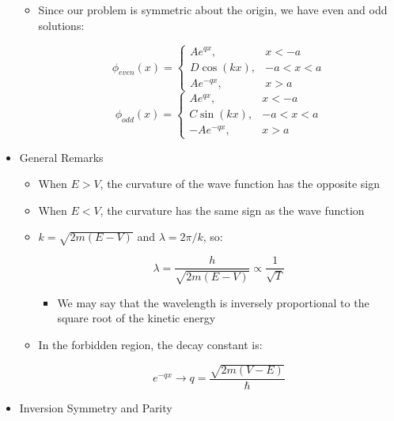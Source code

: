 \begin{itemize}
\begin{itemize}
\begin{enumerate}
          \end{enumerate}

        \item Since our problem is symmetric about the origin, we have even and odd solutions:

          $$\phi_{even}(x)=\left\{\begin{array}{ll} Ae^{qx},& x<-a\\D\cos(kx),&-a<x<a\\ Ae^{-qx},&x>a\end{array}$$
          $$\phi_{odd}(x)=\left\{\begin{array}{ll} Ae^{qx},& x<-a\\C\sin(kx),&-a<x<a\\ -Ae^{-qx},&x>a\end{array}$$

    \end{itemize}

  \item General Remarks

    \begin{itemize}

      \item When $E>V$, the curvature of the wave function has the opposite sign

      \item When $E<V$, the curvature has the same sign as the wave function

      \item $k=\sqrt{2m(E-V)}$ and $\lambda=2\pi/k$, so:

        $$\lambda=\frac{h}{\sqrt{2m(E-V)}}\propto \frac{1}{\sqrt{T}}$$

        \begin{itemize}

          \item We may say that the wavelength is inversely proportional to the square root of the kinetic energy

        \end{itemize}

      \item In the forbidden region, the decay constant is:

        $$e^{-qx}\to q=\frac{\sqrt{2m(V-E)}}{\hbar}$$

    \end{itemize}

  \item Inversion Symmetry and Parity


\end{itemize}
